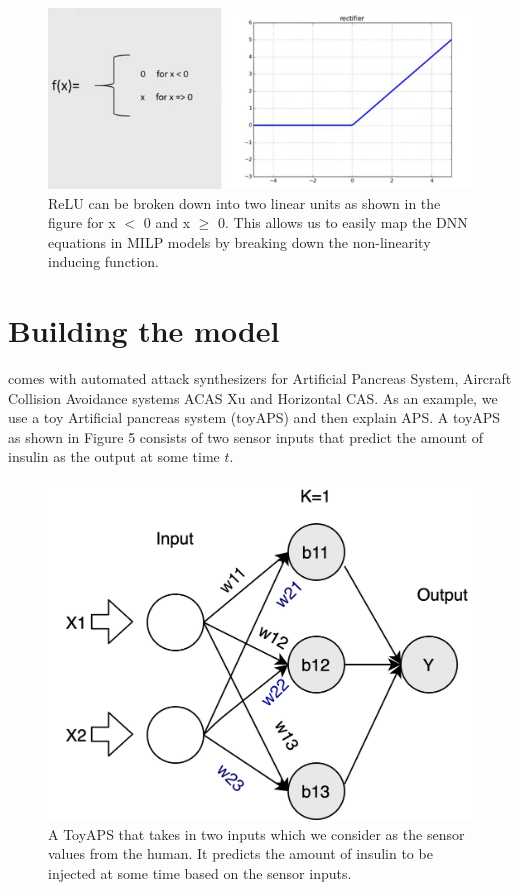 \begin{figure}
	\centering
	\includegraphics[width=0.7\linewidth]{Images/ReLUbreakdown}
	\caption{ReLU can be broken down into two linear units as shown in the figure for x $<$ 0 and x $\geq$ 0. This allows us to easily map the DNN equations in MILP models by breaking down the non-linearity inducing function.}
	\label{fig:relubreakdown}
\end{figure}

\section{Building the model}
\label{section:attacks}
\tool comes with automated attack synthesizers for Artificial Pancreas System, Aircraft Collision Avoidance systems ACAS Xu and Horizontal CAS. %
As an example, we use a toy Artificial pancreas system (toyAPS) and then explain APS. A toyAPS as shown in Figure 5 consists of two sensor inputs that predict the amount of insulin as the output at some time $t$. 
\begin{figure}
	\centering
	\includegraphics[width=0.7\linewidth]{Images/ToyAPS}
	\caption[A ToyAPS]{A ToyAPS that takes in two inputs which we consider as the sensor values from the human. It predicts the amount of insulin to be injected at some time based on the sensor inputs.}
	\label{fig:toyaps}
\end{figure}


